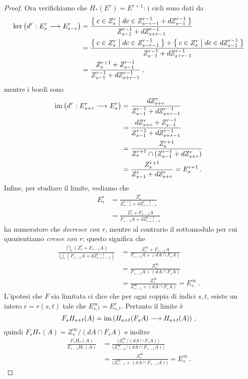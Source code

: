 \begin{thm}
\begin{proof}
		Ora verifichiamo che $H_{*}(E^{r}) = E^{r+1}$: i cicli sono dati da
		\begin{align*}
			\ker \left( d^{r}: E^{r}_{s} \longrightarrow E^{r}_{s-r} \right)
			&= \frac{\Set{c \in Z^{r}_{s} | dc \in Z^{r-1}_{s-r-1} + dZ^{r-1}_{s-1}}}{Z^{r-1}_{s-1} + dZ^{r-1}_{s+r-1}} \\
			&= \frac{\Set{c \in Z^{r}_{s} | dc \in Z^{r-1}_{s-r-1}} + \Set{c \in Z^{r}_{s} | dc \in dZ^{r-1}_{s-1}}}{Z^{r-1}_{s-1} + dZ^{r-1}_{s+r-1}} \\
			&= \frac{Z^{r+1}_{s} + Z_{s-1}^{r-1}}{Z^{r-1}_{s-1} + dZ^{r-1}_{s+r-1}}\,,
		\end{align*}
		mentre i bordi sono
		\begin{align*}
			\operatorname{im} \left( d^{r} : E^{r}_{s+r} \longrightarrow E^{r}_{s} \right)
			&= \frac{dZ_{s+r}^{r}}{Z^{r-1}_{s-1} + dZ_{s+r-1}^{r-1}} \\
			&= \frac{dZ_{s+r}^{r} + Z^{r-1}_{s-1}}{Z^{r-1}_{s-1} + dZ_{s+r-1}^{r-1}} \\
			&= \frac{Z^{r+1}_{s}}{Z_{s}^{r+1} \cap (Z^{r-1}_{s-1} + dZ_{s+r}^{r})} \\
			&= \frac{Z^{r+1}_{s}}{Z^{r}_{s-1} + dZ_{s+r}^{r}} = E^{r+1}_{s}\,.
		\end{align*}
		Infine, per studiare il limite, vediamo che
		\begin{align*}
			E^{r}_{s} &= \frac{Z^{r}_{s}}{Z^{r-1}_{s-1} + dZ_{s+r-1}^{r-1}} \\
			&= \frac{Z^{r}_{s} + F_{s-1}A}{F_{s-1}A + dZ_{s+r-1}^{r-1}}
		\end{align*}
		ha numeratore che \emph{decresce con $r$},
		mentre al contrario il sottomodulo per cui quozientiamo
		\emph{cresce con $r$}: questo significa che
		\begin{align*}
			\frac{\bigcap_{r}(Z^{r}_{s} + F_{s-1}A)}{\bigcup_{r} (F_{s-1}A + dZ_{s+r-1}^{r-1})}
			&= \frac{Z^{\infty}_{s} + F_{s-1}A}{F_{s-1}A + (dA \cap F_{s}A)} \\
			&=  \frac{Z^{\infty}_{s}}{F_{s-1}A + (dA \cap F_{s}A)} \\
			&= \frac{Z^{\infty}_{s}}{Z^{\infty}_{s-1} + (dA \cap F_{s}A)} = E^{\infty}_{s}\,.
		\end{align*}
		L'ipotesi che $F$ sia limitata ci dice che per ogni coppia di indici $s,t$,
		esiste un intero $r = r(s,t)$ tale che $E^{\infty}_{s,t} = E^{r}_{s,t}$.
		Pertanto il limite è
		\begin{equation*}
			F_{s}H_{s+t}(A) = 
			\operatorname{im} \left( H_{s+t}(F_{s}A) \longrightarrow H_{s+t}(A) \right) \,,
		\end{equation*}
		quindi $F_{s}H_{*}(A) = Z^{\infty}_{s}/(dA \cap F_{s}A)$ e inoltre
		\begin{align*}
			\frac{F_{s}H_{*}(A)}{F_{s-1}H_{*}(A)}
			&= \frac{\big(Z_{s}^{\infty}/(dA \cap F_{s}A) \big)}{\big(Z_{s-1}^{\infty}/(dA \cap F_{s-1}A) \big)} \\
			&= \frac{Z_{s}^{\infty}}{\big(Z_{s-1}^{\infty} + (dA \cap F_{s-1}A) \big)} 
			= E^{\infty}_{s}\,. 
		\end{align*}
	\end{proof}
\end{thm}


